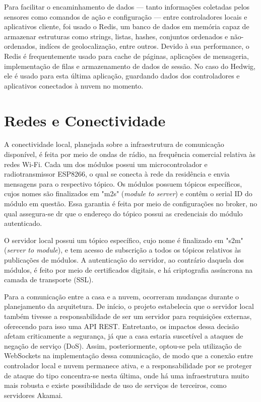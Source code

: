Para facilitar o encaminhamento de dados --- tanto informações coletadas pelos sensores como comandos de ação e configuração --- entre controladores locais e aplicativos cliente, foi usado o Redis, um banco de dados em memória capaz de armazenar estruturas como strings, listas, hashes, conjuntos ordenados e não-ordenados, indíces de geolocalização, entre outros. Devido à sua performance, o Redis é frequentemente usado para cache de páginas, aplicações de mensageria, implementação de filas e armazenamento de dados de sessão. No caso do Hedwig, ele é usado para esta última aplicação, guardando dados dos controladores e aplicativos conectados à nuvem no momento.

\section{Redes e Conectividade}

A conectividade local, planejada sobre a infraestrutura de comunicação disponível, é feita por meio de ondas de rádio, na frequência comercial relativa às redes Wi-Fi. Cada um dos módulos possui um microcontrolador e radiotransmissor ESP8266, o qual se conecta à rede da residência e envia mensagens para o respectivo tópico. Os módulos possuem tópicos específicos, cujos nomes são finalizados em "m2s" (\emph{module to server}) e contêm o serial ID do módulo em questão. Essa garantia é feita por meio de configurações no broker, no qual assegura-se dr que o endereço do tópico possui as credenciais do módulo autenticado.

O servidor local possui um tópico específico, cujo nome é finalizado em "s2m" (\emph{server to module}), e tem acesso de subscrição a todos os tópicos relativos às publicações de módulos. A autenticação do servidor, ao contrário daquela dos módulos, é feito por meio de certificados digitais, e há criptografia assíncrona na camada de transporte (SSL).

Para a comunicação entre a casa e a nuvem, ocorreram mudanças durante o planejamento da arquitetura. De início, o projeto estabelecia que o servidor local também tivesse a responsabilidade de ser um servidor para requisições externas, oferecendo para isso uma API REST. Entretanto, os impactos dessa decisão afetam criticamente a segurança, já que a casa estaria suscetível a ataques de negação de serviço (DoS). Assim, posteriormente, optou-se pela utilização de WebSockets na implementação dessa comunicação, de modo que a conexão entre controlador local e nuvem permanece ativa, e a responsabilidade por se proteger de ataque do tipo concentra-se nesta última, onde há uma infraestrutura muito mais robusta e existe possibilidade de uso de serviços de terceiros, como servidores Akamai.

